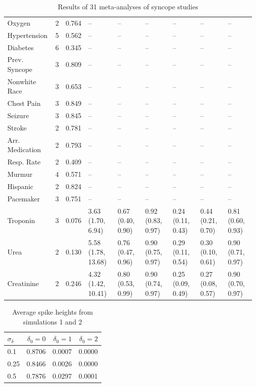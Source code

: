 \documentclass[AMA,STIX1COL]{WileyNJD-v2}
\begin{document}
\begin{table}
\begin{tabular}{lllllllll}
  Oxygen & 2 & 0.764 & -- & -- & -- & -- & -- & -- \\ 
  Hypertension & 5 & 0.562 & -- & -- & -- & -- & -- & -- \\ 
  Diabetes & 6 & 0.345 & -- & -- & -- & -- & -- & -- \\ 
  Prev. Syncope & 3 & 0.809 & -- & -- & -- & -- & -- & -- \\ 
  Nonwhite Race & 3 & 0.653 & -- & -- & -- & -- & -- & -- \\ 
  Chest Pain & 3 & 0.849 & -- & -- & -- & -- & -- & -- \\ 
  Seizure & 3 & 0.845 & -- & -- & -- & -- & -- & -- \\ 
  Stroke & 2 & 0.781 & -- & -- & -- & -- & -- & -- \\ 
  Arr. Medication & 2 & 0.793 & -- & -- & -- & -- & -- & -- \\ 
  Resp. Rate & 2 & 0.409 & -- & -- & -- & -- & -- & -- \\ 
  Murmur & 4 & 0.571 & -- & -- & -- & -- & -- & -- \\ 
  Hispanic & 2 & 0.824 & -- & -- & -- & -- & -- & -- \\ 
  Pacemaker & 3 & 0.751 & -- & -- & -- & -- & -- & -- \\ 
  Troponin & 3 & 0.076 & 3.63 (1.70, 6.94) & 0.67 (0.40, 0.90) & 0.92 (0.83, 0.97) & 0.24 (0.11, 0.43) & 0.44 (0.21, 0.70) & 0.81 (0.60, 0.93) \\ 
  Urea & 2 & 0.130 & 5.58 (1.78, 13.68) & 0.76 (0.47, 0.96) & 0.90 (0.75, 0.97) & 0.29 (0.11, 0.54) & 0.30 (0.10, 0.61) & 0.90 (0.71, 0.97) \\ 
  Creatinine & 2 & 0.246 & 4.32 (1.42, 10.41) & 0.80 (0.53, 0.99) & 0.90 (0.74, 0.97) & 0.25 (0.09, 0.49) & 0.27 (0.08, 0.57) & 0.90 (0.70, 0.97) \\ 
   \hline
\end{tabular}
\caption{Results of 31 meta-analyses of syncope studies} 
\label{table:syncope}
\end{table}

\clearpage 

\begin{table}[ht]
\centering
\begin{tabular}{lrrr}
  \hline
 $\sigma_\delta$ & $\delta_0 = 0$ & $\delta_0 = 1$ & $\delta_0 = 2$ \\ 
  \hline
0.1 & 0.8706 & 0.0007 & 0.0000 \\ 
  0.25 & 0.8466 & 0.0026 & 0.0000 \\ 
  0.5& 0.7876 & 0.0297 & 0.0001 \\ 
   \hline
\end{tabular}
\caption{Average spike heights from simulations 1 and 2} 
\label{table:spike-height}
\end{table}
\end{document}
